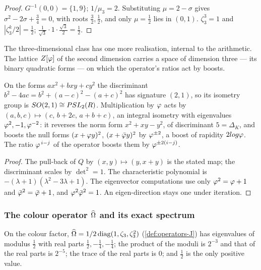 \begin{proof}
$G^{-1}(0,0)=\{1,9\}$; $1/\mu_3=2$.  Substituting $\mu=2-\sigma$ gives
$\sigma^2-2\sigma+\tfrac34=0$, with roots $\tfrac32,\tfrac12$, and only $\mu=\tfrac12$
lies in $(0,1)$.  $\zeta_3^3=1$ and $|\zeta_3^k/2|=\tfrac12$;
$\tfrac1{\sqrt3}\cdot1\cdot\tfrac{\sqrt3}2=\tfrac12$.
\end{proof}

The three-dimensional class has one more realisation, internal to the arithmetic.
The lattice $\Zphi$ of the second dimension carries a space of dimension three --- its
binary quadratic forms --- on which the operator's ratios act by boosts.

\begin{proposition}[The binary forms of $\Zphi$ as a domain of $d=3$]\label{prop:binary-forms}
On the forms $ax^2+bxy+cy^2$ the discriminant $b^2-4ac=b^2+(a-c)^2-(a+c)^2$ has
signature $(2,1)$, so its isometry group is $SO(2,1)\cong PSL_2(R)$.  Multiplication
by $\varphi$ acts by $(a,b,c)\mapsto(c,\,b+2c,\,a+b+c)$, an integral isometry with
eigenvalues $\varphi^2,-1,\varphi^{-2}$: it reverses the norm form $x^2+xy-y^2$, of
discriminant $5=\Delta_K$, and boosts the null forms $(x+\varphi y)^2$,
$(x+\bar{\varphi} y)^2$ by $\varphi^{\pm2}$, a boost of rapidity $2log\varphi$.  The ratio
$\varphi^{\,i-j}$ of the operator boosts them by $\varphi^{\pm2(i-j)}$.
%
\end{proposition}

\begin{proof}
The pull-back of $Q$ by $(x,y)\mapsto(y,x+y)$ is the stated map; the discriminant
scales by $\det^2=1$.  The characteristic polynomial is
$-(\lambda+1)(\lambda^2-3\lambda+1)$.  The eigenvector computations use only
$\varphi^2=\varphi+1$ and $\bar{\varphi}^2=\bar{\varphi}+1$, and $\varphi^2\bar{\varphi}^2=1$.
An eigen-direction stays one under iteration.
\end{proof}

\subsubsection{The colour operator $\widehat{\Omega}$ and its exact spectrum}\label{ssec:omega}

\begin{proposition}\label{prop:omega-spectrum}
On the colour factor, $\widehat{\Omega}=1/2\operatorname{diag}(1,\zeta_3,\zeta_3^2)$ (\cref{def:operators-J}) has eigenvalues of modulus
$\tfrac12$ with real parts $\tfrac12,-\tfrac14,-\tfrac14$; the product of the moduli is
$2^{-3}$ and that of the real parts is $2^{-5}$; the trace of the real parts is $0$;
and $\tfrac12$ is the only positive value.
%
\end{proposition}

